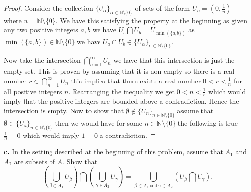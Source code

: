 \documentclass{amsart}
\theoremstyle{plain}
\theoremstyle{definition}
\theoremstyle{remark}
\begin{document}
\begin{proof}
    Consider the collection $\{U_\alpha\}_{\alpha \in \mathbb{N}\setminus \{0\}}$ of sets of the form $U_n=(0,\frac{1}{n})$ where $n=\mathbb{N}\setminus\{0\}$. We have this satisfying the property at the beginning as given any two positive integers $a,b$ we have $U_a\bigcap U_b=U_{\min(\{a,b\})}$ as $\min(\{a,b\})\in \mathbb{N}\setminus\{0\}$ we have $ U_a\cap U_b\in \{U_\alpha\}_{\alpha \in \mathbb{N}\setminus \{0\}}$. 

    Now take the intersection $\bigcap_{n=1}^\infty U_n$ we have that this intersection is just the empty set. This is proven by assuming that it is non empty so there is a real number $r\in \bigcap_{n=1}^{\infty}U_n$ this implies that there exists a real number $0<r<\frac{1}{n}$ for all positive integers $n$. Rearranging the inequality we get $0<n<\frac{1}{r}$  which would imply that the positive integers are bounded above a contradiction. Hence the intersection is empty. Now to show that $\emptyset \not \in \{U_n\}_{n\in \mathbb{N}\setminus \{0\}}$ assume that $\emptyset \in \{U_n\}_{n\in \mathbb{N}\setminus \{0\}}$ then we would have for some $n\in \mathbb{N}\setminus \{0\}$ the following is true $\frac{1}{n}=0$ which would imply $1=0$ a contradiction. 
    
\end{proof}

\vspace{.1in}





{\bfseries c.} In the setting described at the beginning of this problem, assume that $A_1$ and $A_2$ are subsets of $A$. Show that
\[
    \left( \bigcup _{\beta \in A_1} U_{\beta} \right) \bigcap \left( \bigcup _{\gamma \in A_2} U_{\gamma} \right) = \bigcup _{\beta \in A_1 \ \mbox{and} \ \gamma \in A_2} (U_{\beta} \bigcap U_{\gamma}).
\]
\end{document}
